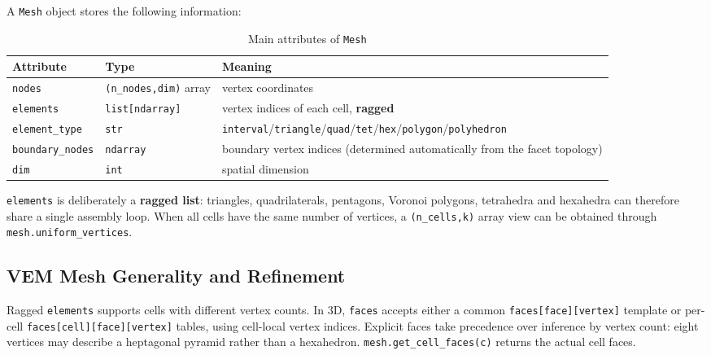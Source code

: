 \documentclass[11pt,oneside]{book}
\theoremstyle{definition}
\theoremstyle{plain}
\newenvironment{important}{%
  \begin{tcolorbox}[colback=blue!5,colframe=blue!45,title=Key Point,fonttitle=\bfseries]%
}{%
  \end{tcolorbox}%
}
\newcommand{\code}[1]{\texttt{#1}}
\begin{document}
A \code{Mesh} object stores the following information:

\begin{table}[htbp]
\centering
\caption{Main attributes of \code{Mesh}}
\label{tab:mesh-attrs}
\begin{lrbox}{\guideTableBox}
\begin{tabular}{@{}L{2.8cm}L{1.9cm}L{9.9cm}@{}}
\toprule
Attribute & Type & Meaning \\
\midrule
\code{nodes} & \code{(n\_\allowbreak nodes,\allowbreak  dim)} array & vertex coordinates \\
\code{elements} & \code{list[}\allowbreak\code{ndarray]} & vertex indices of each cell, \textbf{ragged} \\
\code{element\_\allowbreak type} & \code{str} & \code{interval}/\allowbreak\code{triangle}/\allowbreak\code{quad}/\allowbreak\code{tet}/\allowbreak\code{hex}/\allowbreak\code{polygon}/\allowbreak\code{polyhedron} \\
\code{boundary\_\allowbreak nodes} & \code{ndarray} & boundary vertex indices (determined automatically from the facet topology) \\
\code{dim} & \code{int} & spatial dimension \\
\bottomrule
\end{tabular}
\end{lrbox}%
\ifdim\wd\guideTableBox>\linewidth
  \resizebox{\linewidth}{!}{\usebox{\guideTableBox}}%
\else\usebox{\guideTableBox}\fi
\end{table}

\begin{important}
\code{elements} is deliberately a \textbf{ragged list}: triangles, quadrilaterals,
pentagons, Voronoi polygons, tetrahedra and hexahedra can therefore share a single
assembly loop. When all cells have the same number of vertices, a
\code{(n\_\allowbreak cells,\allowbreak  k)} array view can be obtained through \code{mesh.uniform\_\allowbreak vertices}.
\end{important}

\subsection{VEM Mesh Generality and Refinement}
\label{sec:vem-mesh-general}
Ragged \code{elements} supports cells with different vertex counts. In 3D,
\code{faces} accepts either a common \code{faces[face][vertex]} template or
per-cell \code{faces[cell]}\allowbreak\code{[face][vertex]} tables, using cell-local vertex indices.
Explicit faces take precedence over inference by vertex count: eight vertices may
describe a heptagonal pyramid rather than a hexahedron.
\code{mesh.get\_\allowbreak cell\_\allowbreak faces(c)} returns the actual cell faces.
\end{document}
